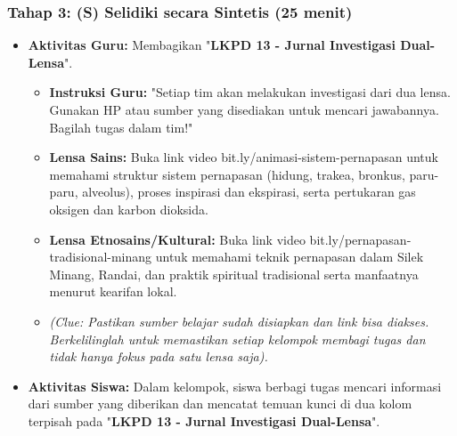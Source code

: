\documentclass[a4paper,12pt]{article}
\begin{document}
\subsubsection{Tahap 3: (S) Selidiki secara Sintetis (25 menit)}
\begin{itemize}
\item \textbf{Aktivitas Guru:} Membagikan "\textbf{LKPD 13 - Jurnal Investigasi Dual-Lensa}".
    \begin{itemize}
    \item \textbf{Instruksi Guru:} "Setiap tim akan melakukan investigasi dari dua lensa. Gunakan HP atau sumber yang disediakan untuk mencari jawabannya. Bagilah tugas dalam tim!"
    \item \textbf{Lensa Sains:} Buka link video bit.ly/animasi-sistem-pernapasan untuk memahami struktur sistem pernapasan (hidung, trakea, bronkus, paru-paru, alveolus), proses inspirasi dan ekspirasi, serta pertukaran gas oksigen dan karbon dioksida.
    \item \textbf{Lensa Etnosains/Kultural:} Buka link video bit.ly/pernapasan-tradisional-minang untuk memahami teknik pernapasan dalam Silek Minang, Randai, dan praktik spiritual tradisional serta manfaatnya menurut kearifan lokal.
    \item \textit{(Clue: Pastikan sumber belajar sudah disiapkan dan link bisa diakses. Berkelilinglah untuk memastikan setiap kelompok membagi tugas dan tidak hanya fokus pada satu lensa saja).}
    \end{itemize}
\item \textbf{Aktivitas Siswa:} Dalam kelompok, siswa berbagi tugas mencari informasi dari sumber yang diberikan dan mencatat temuan kunci di dua kolom terpisah pada "\textbf{LKPD 13 - Jurnal Investigasi Dual-Lensa}".
\end{itemize}
\end{document}
